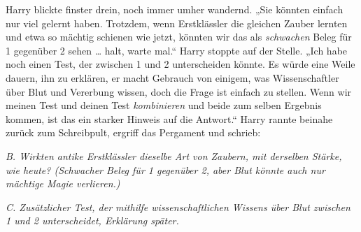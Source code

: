 Harry blickte finster drein, noch immer umher wandernd.
„Sie könnten einfach nur viel gelernt haben. Trotzdem, wenn Erstklässler die gleichen Zauber lernten und etwa so mächtig schienen wie jetzt, könnten wir das als \emph{schwachen} Beleg für 1 gegenüber 2 sehen … halt, warte mal.“ Harry stoppte auf der Stelle.
„Ich habe noch einen Test, der zwischen 1 und 2 unterscheiden könnte. Es würde eine Weile dauern, ihn zu erklären, er macht Gebrauch von einigem, was Wissenschaftler über Blut und Vererbung wissen, doch die Frage ist einfach zu stellen. Wenn wir meinen Test und deinen Test \emph{kombinieren} und beide zum selben Ergebnis kommen, ist das ein starker Hinweis auf die Antwort.“ Harry rannte beinahe zurück zum Schreibpult, ergriff das Pergament und schrieb:

\emph{B. Wirkten antike Erstklässler dieselbe Art von Zaubern, mit derselben Stärke, wie heute? (Schwacher Beleg für 1 gegenüber 2, aber Blut könnte auch nur mächtige Magie verlieren.)}

\emph{C. Zusätzlicher Test, der mithilfe wissenschaftlichen Wissens über Blut zwischen 1 und 2 unterscheidet, Erklärung später.}

